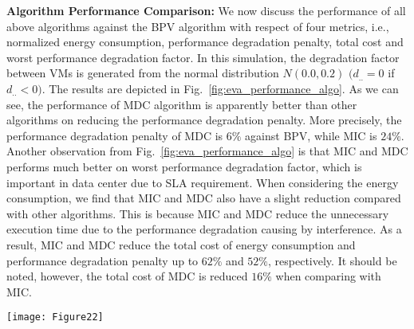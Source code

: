 \documentclass[10pt,journal]{IEEEtran}
\begin{document}
\textbf{Algorithm Performance Comparison:} We now discuss the performance of all above algorithms against the BPV algorithm with respect of four metrics, i.e., normalized energy consumption, performance degradation penalty, total cost and worst performance degradation factor. In this simulation, the degradation factor between VMs is generated from the normal distribution $N(0.0,0.2)$ $(d_{..}=0$ if $d_{..}<0)$. The results are depicted in Fig.~\ref{fig:eva_performance_algo}. As we can see, the performance of MDC algorithm is apparently better than other algorithms on reducing the performance degradation penalty. More precisely, the performance degradation penalty of MDC is $6\%$ against BPV, while MIC is $24\%$. Another observation from Fig.~\ref{fig:eva_performance_algo} is that MIC and MDC performs much better on worst performance degradation factor, which is important in data center due to SLA requirement. When considering the energy consumption, we find that MIC and MDC also have a slight reduction compared with other algorithms. This is because MIC and MDC reduce the unnecessary execution time due to the performance degradation causing by interference. As a result, MIC and MDC reduce the total cost of energy consumption and performance degradation penalty up to $62\%$ and $52\%$, respectively. It should be noted, however, the total cost of MDC is reduced $16\%$ when comparing with MIC.
\begin{figure*}[htbp]
\centering
\texttt{[image: Figure22]}
\centering
\caption{\label{fig:eva_performance_algo}Performance of algorithms. (a) Normalized energy consumption against BPV; (b) Normalized performance degradation penalty against BPV; (c) Normalized total cost against BPV; (d) Normalized worst performance degradation factor against BPV.}
\end{figure*}
\end{document}
